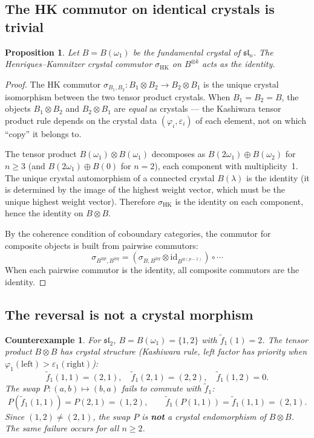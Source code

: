 \documentclass[11pt]{article}
\newtheorem{proposition}[theorem]{Proposition}
\newtheorem{counterexample}[theorem]{Counterexample}
\theoremstyle{remark}
\begin{document}
\subsection{The HK commutor on identical crystals is trivial}

\begin{proposition}\label{prop:hk-trivial}
Let $B = B(\omega_1)$ be the fundamental crystal of
$\mathfrak{sl}_n$. The Henriques--Kamnitzer crystal commutor
$\sigma_{\mathrm{HK}}$ on $B^{\otimes k}$ acts as the identity.
\end{proposition}

\begin{proof}
The HK commutor $\sigma_{B_1,B_2}\colon B_1 \otimes B_2 \to
B_2 \otimes B_1$ is the unique crystal isomorphism between the two
tensor product crystals. When $B_1 = B_2 = B$, the objects
$B_1 \otimes B_2$ and $B_2 \otimes B_1$ are \emph{equal} as crystals
--- the Kashiwara tensor product rule depends on the crystal data
$(\varphi_i, \varepsilon_i)$ of each element, not on which ``copy'' it
belongs to.

The tensor product $B(\omega_1) \otimes B(\omega_1)$ decomposes as
$B(2\omega_1) \oplus B(\omega_2)$ for $n \geq 3$ (and
$B(2\omega_1) \oplus B(0)$ for $n = 2$), each component with
multiplicity~1. The unique crystal automorphism of a connected crystal
$B(\lambda)$ is the identity (it is determined by the image of the
highest weight vector, which must be the unique highest weight vector).
Therefore $\sigma_{\mathrm{HK}}$ is the identity on each component,
hence the identity on $B \otimes B$.

By the coherence condition of coboundary categories, the commutor for
composite objects is built from pairwise commutors:
\[
  \sigma_{B^{\otimes p}, B^{\otimes q}} =
  (\sigma_{B, B^{\otimes q}} \otimes \mathrm{id}_{B^{\otimes(p-1)}})
  \circ \cdots
\]
When each pairwise commutor is the identity, all composite commutors
are the identity.
\end{proof}

\subsection{The reversal is not a crystal morphism}

\begin{counterexample}\label{ce:swap}
For $\mathfrak{sl}_2$, $B = B(\omega_1) = \{1, 2\}$ with
$\tilde{f}_1(1) = 2$. The tensor product $B \otimes B$ has crystal
structure (Kashiwara rule, left factor has priority when
$\varphi_1(\text{left}) > \varepsilon_1(\text{right})$):
\[
  \tilde{f}_1(1, 1) = (2, 1), \quad
  \tilde{f}_1(2, 1) = (2, 2), \quad
  \tilde{f}_1(1, 2) = 0.
\]
The swap $P\colon (a,b) \mapsto (b,a)$ fails to commute with
$\tilde{f}_1$:
\[
  P(\tilde{f}_1(1, 1)) = P(2, 1) = (1, 2), \qquad
  \tilde{f}_1(P(1, 1)) = \tilde{f}_1(1, 1) = (2, 1).
\]
Since $(1, 2) \neq (2, 1)$, the swap $P$ is \textbf{not} a crystal
endomorphism of $B \otimes B$. The same failure occurs for all
$n \geq 2$.
\end{counterexample}
\end{document}
